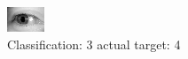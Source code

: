 \begin{figure}[h!]
\begin{center}
\includegraphics[width=0.60\columnwidth]{figures/ID3253_class_3_target_4.png}
\end{center}
\caption{ Classification: 3 actual target: 4}
\label{fig:ID3253_class_3_target_4}
\end{figure}

